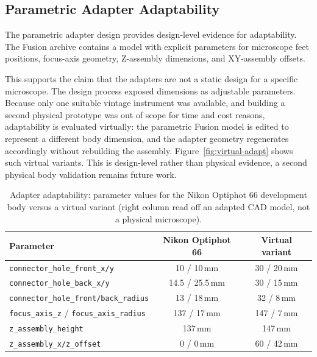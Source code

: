 \subsection{Parametric Adapter Adaptability}

The parametric adapter design provides design-level evidence for adaptability. The Fusion archive contains a model with explicit parameters for microscope feet positions, focus-axis geometry, Z-assembly dimensions, and XY-assembly offsets.

This supports the claim that the adapters are not a static design for a specific microscope. The design process exposed dimensions as adjustable parameters. Because only one suitable vintage instrument was available, and building a second physical prototype was out of scope for time and cost reasons, adaptability is evaluated virtually: the parametric Fusion model is edited to represent a different body dimension, and the adapter geometry regenerates accordingly without rebuilding the assembly. Figure~\ref{fig:virtual-adapt} shows such virtual variants. This is design-level rather than physical evidence, a second physical body validation remains future work.



\begin{table}[H]
    \centering
    \caption[Adapter adaptability parameters]{Adapter adaptability: parameter values for the Nikon Optiphot 66 development body versus a
    virtual variant (right column read off an adapted CAD model, not a physical microscope).}
    \label{tab:adaptability}
    \begin{tabular}{@{}l c c@{}}
        \toprule
        \textbf{Parameter} & \textbf{Nikon Optiphot 66} & \textbf{Virtual variant} \\
        \midrule
        \texttt{connector\_hole\_front\_x/y} & 10 / 10\,mm & 30 / 20\,mm \\
        \texttt{connector\_hole\_back\_x/y}  & 14.5 / 25.5\,mm & 30 / 15\,mm \\
        \texttt{connector\_hole\_front/back\_radius} & 13 / 18\,mm & 32 / 8\,mm \\
        \texttt{focus\_axis\_z} / \texttt{focus\_axis\_radius} & 137 / 17\,mm & 147 / 7\,mm \\
        \texttt{z\_assembly\_height} & 137\,mm & 147\,mm \\
        \texttt{z\_assembly\_x/z\_offset} & 0 / 0\,mm & 60 / 42\,mm \\
        \bottomrule
    \end{tabular}
\end{table}

